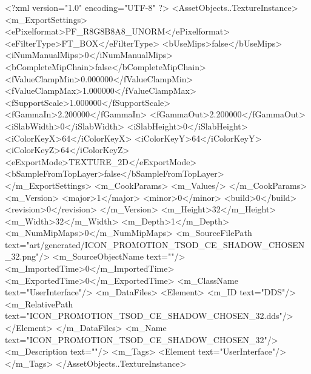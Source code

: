 <?xml version="1.0" encoding="UTF-8" ?>
<AssetObjects..TextureInstance>
	<m_ExportSettings>
		<ePixelformat>PF_R8G8B8A8_UNORM</ePixelformat>
		<eFilterType>FT_BOX</eFilterType>
		<bUseMips>false</bUseMips>
		<iNumManualMips>0</iNumManualMips>
		<bCompleteMipChain>false</bCompleteMipChain>
		<fValueClampMin>0.000000</fValueClampMin>
		<fValueClampMax>1.000000</fValueClampMax>
		<fSupportScale>1.000000</fSupportScale>
		<fGammaIn>2.200000</fGammaIn>
		<fGammaOut>2.200000</fGammaOut>
		<iSlabWidth>0</iSlabWidth>
		<iSlabHeight>0</iSlabHeight>
		<iColorKeyX>64</iColorKeyX>
		<iColorKeyY>64</iColorKeyY>
		<iColorKeyZ>64</iColorKeyZ>
		<eExportMode>TEXTURE_2D</eExportMode>
		<bSampleFromTopLayer>false</bSampleFromTopLayer>
	</m_ExportSettings>
	<m_CookParams>
		<m_Values/>
	</m_CookParams>
	<m_Version>
		<major>1</major>
		<minor>0</minor>
		<build>0</build>
		<revision>0</revision>
	</m_Version>
	<m_Height>32</m_Height>
	<m_Width>32</m_Width>
	<m_Depth>1</m_Depth>
	<m_NumMipMaps>0</m_NumMipMaps>
	<m_SourceFilePath text="art/generated/ICON_PROMOTION_TSOD_CE_SHADOW_CHOSEN_32.png"/>
	<m_SourceObjectName text=""/>
	<m_ImportedTime>0</m_ImportedTime>
	<m_ExportedTime>0</m_ExportedTime>
	<m_ClassName text="UserInterface"/>
	<m_DataFiles>
		<Element>
			<m_ID text="DDS"/>
			<m_RelativePath text="ICON_PROMOTION_TSOD_CE_SHADOW_CHOSEN_32.dds"/>
		</Element>
	</m_DataFiles>
	<m_Name text="ICON_PROMOTION_TSOD_CE_SHADOW_CHOSEN_32"/>
	<m_Description text=""/>
	<m_Tags>
		<Element text="UserInterface"/>
	</m_Tags>
</AssetObjects..TextureInstance>

